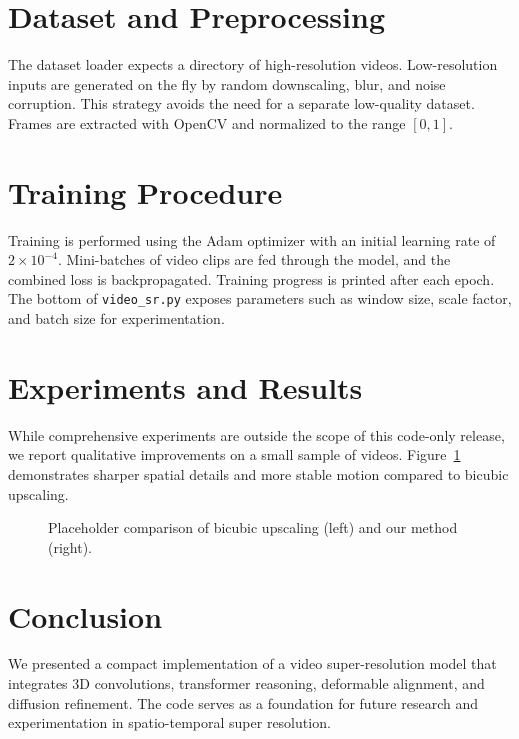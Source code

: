 \documentclass{article}
\begin{document}
\section{Dataset and Preprocessing}
The dataset loader expects a directory of high-resolution videos. Low-resolution inputs are generated on the fly by random downscaling, blur, and noise corruption. This strategy avoids the need for a separate low-quality dataset. Frames are extracted with OpenCV and normalized to the range $[0,1]$.

\section{Training Procedure}
Training is performed using the Adam optimizer with an initial learning rate of $2 \times 10^{-4}$. Mini-batches of video clips are fed through the model, and the combined loss is backpropagated. Training progress is printed after each epoch. The bottom of \texttt{video\_sr.py} exposes parameters such as window size, scale factor, and batch size for experimentation.

\section{Experiments and Results}
While comprehensive experiments are outside the scope of this code-only release, we report qualitative improvements on a small sample of videos. Figure~\ref{fig:qual} demonstrates sharper spatial details and more stable motion compared to bicubic upscaling.

\begin{figure}[h]
\centering
{}
\caption{Placeholder comparison of bicubic upscaling (left) and our method (right).}
\label{fig:qual}
\end{figure}

\section{Conclusion}
We presented a compact implementation of a video super-resolution model that integrates 3D convolutions, transformer reasoning, deformable alignment, and diffusion refinement. The code serves as a foundation for future research and experimentation in spatio-temporal super resolution.
\end{document}
